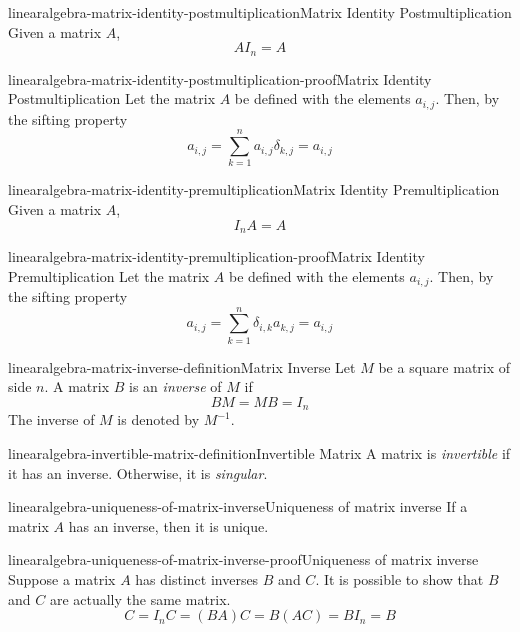\documentclass[preview]{standalone}
\begin{document}
\begin{snippetproposition}{linearalgebra-matrix-identity-postmultiplication}{Matrix Identity Postmultiplication}
    Given a matrix \(A\),
    \[ AI_n=A \]
\end{snippetproposition}

\begin{snippetproof}{linearalgebra-matrix-identity-postmultiplication-proof}{Matrix Identity Postmultiplication}
    Let the matrix \(A\) be defined with the
    elements \(a_{i,j}\).
    Then, by the sifting property %
    \[
        a_{i,j} = \sum_{k=1}^n
        a_{i,j}\delta_{k,j} = a_{i,j}
    \]
\end{snippetproof}

\begin{snippetproposition}{linearalgebra-matrix-identity-premultiplication}{Matrix Identity Premultiplication}
    Given a matrix \(A\),
    \[ I_n A=A \]
\end{snippetproposition}

\begin{snippetproof}{linearalgebra-matrix-identity-premultiplication-proof}{Matrix Identity Premultiplication}
    Let the matrix \(A\) be defined with the
    elements \(a_{i,j}\).
    Then, by the sifting property %
    \[
        a_{i,j} = \sum_{k=1}^n
        \delta_{i,k}a_{k,j} = a_{i,j}
    \]
\end{snippetproof}

\begin{snippetdefinition}{linearalgebra-matrix-inverse-definition}{Matrix Inverse}
    Let \(M\) be a square matrix of side \(n\).
    A matrix \(B\) is an \textit{inverse}
    of \(M\) if \[BM=MB=I_n\]
    The inverse of \(M\) is denoted by \(M^{-1}\).
\end{snippetdefinition}

\begin{snippetdefinition}{linearalgebra-invertible-matrix-definition}{Invertible Matrix}
    A matrix is \textit{invertible} if it has an inverse.
    Otherwise, it is \textit{singular}.
\end{snippetdefinition}

\begin{snippetproposition}{linearalgebra-uniqueness-of-matrix-inverse}{Uniqueness of matrix inverse}
    If a matrix \(A\) has an inverse, then it is unique.
\end{snippetproposition}

\begin{snippetproof}{linearalgebra-uniqueness-of-matrix-inverse-proof}{Uniqueness of matrix inverse}
    Suppose a matrix \(A\) has distinct inverses \(B\)
    and \(C\).
    It is possible to show that \(B\) and \(C\) are actually
    the same matrix.
    \[
        C=I_n C = (BA) C = B (AC) = BI_n = B
    \]
\end{snippetproof}
\end{document}
